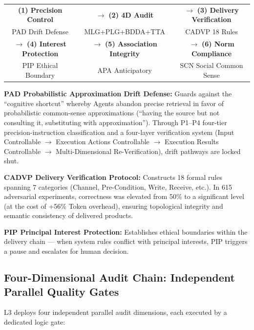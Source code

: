 \documentclass[11pt,a4paper]{article}
\begin{document}
\begin{center}
\begin{tabular}{c c c}
\textbf{(1) Precision Control} & $\rightarrow$ \textbf{(2) 4D Audit} & $\rightarrow$ \textbf{(3) Delivery Verification} \\
{\scriptsize PAD Drift Defense} & {\scriptsize MLG+PLG+BDDA+TTA} & {\scriptsize CADVP 18 Rules} \\[6pt]
$\rightarrow$ \textbf{(4) Interest Protection} & $\rightarrow$ \textbf{(5) Association Integrity} & $\rightarrow$ \textbf{(6) Norm Compliance} \\
{\scriptsize PIP Ethical Boundary} & {\scriptsize APA Anticipatory} & {\scriptsize SCN Social Common Sense}
\end{tabular}
\end{center}

\textbf{PAD Probabilistic Approximation Drift Defense:} Guards against the ``cognitive shortcut'' whereby Agents abandon precise retrieval in favor of probabilistic common-sense approximations (``having the source but not consulting it, substituting with approximation''). Through P1--P4 four-tier precision-instruction classification and a four-layer verification system (Input Controllable $\rightarrow$ Execution Actions Controllable $\rightarrow$ Execution Results Controllable $\rightarrow$ Multi-Dimensional Re-Verification), drift pathways are locked shut.

\textbf{CADVP Delivery Verification Protocol:} Constructs 18 formal rules spanning 7 categories (Channel, Pre-Condition, Write, Receive, etc.). In 615 adversarial experiments, correctness was elevated from 50\% to a significant level (at the cost of +56\% Token overhead), ensuring topological integrity and semantic consistency of delivered products.

\textbf{PIP Principal Interest Protection:} Establishes ethical boundaries within the delivery chain --- when system rules conflict with principal interests, PIP triggers a pause and escalates for human decision.

\subsection{Four-Dimensional Audit Chain: Independent Parallel Quality Gates}

L3 deploys four independent parallel audit dimensions, each executed by a dedicated logic gate:
\end{document}
